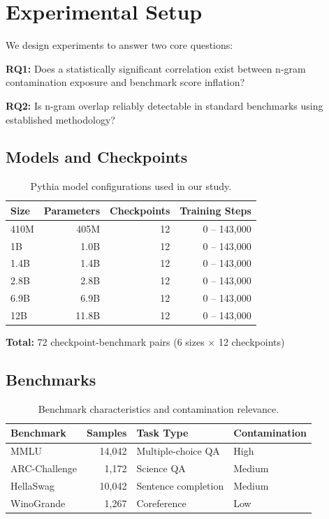 \section{Experimental Setup}

We design experiments to answer two core questions:

\textbf{RQ1:} Does a statistically significant correlation exist between n-gram contamination exposure and benchmark score inflation?

\textbf{RQ2:} Is n-gram overlap reliably detectable in standard benchmarks using established methodology?

\subsection{Models and Checkpoints}

\begin{table}[t]
\centering
\caption{Pythia model configurations used in our study.}
\label{tab:models}
\begin{tabular}{@{}lrrr@{}}
\toprule
Size & Parameters & Checkpoints & Training Steps \\
\midrule
410M & 405M & 12 & 0 -- 143,000 \\
1B & 1.0B & 12 & 0 -- 143,000 \\
1.4B & 1.4B & 12 & 0 -- 143,000 \\
2.8B & 2.8B & 12 & 0 -- 143,000 \\
6.9B & 6.9B & 12 & 0 -- 143,000 \\
12B & 11.8B & 12 & 0 -- 143,000 \\
\bottomrule
\end{tabular}
\end{table}

\textbf{Total:} 72 checkpoint-benchmark pairs (6 sizes $\times$ 12 checkpoints)

\subsection{Benchmarks}

\begin{table}[t]
\centering
\caption{Benchmark characteristics and contamination relevance.}
\label{tab:benchmarks}
\begin{tabular}{@{}lrll@{}}
\toprule
Benchmark & Samples & Task Type & Contamination \\
\midrule
MMLU & 14,042 & Multiple-choice QA & High \\
ARC-Challenge & 1,172 & Science QA & Medium \\
HellaSwag & 10,042 & Sentence completion & Medium \\
WinoGrande & 1,267 & Coreference & Low \\
\bottomrule
\end{tabular}
\end{table}

